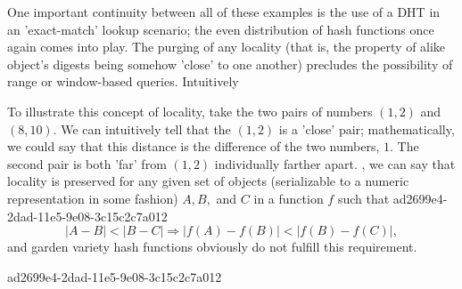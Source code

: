 \documentclass[12pt]{article}
\begin{document}
\par One important continuity between all of these examples is the use of a DHT in an 'exact-match' lookup scenario; the even distribution of hash functions once again comes into play. The purging of any locality (that is, the property of alike object's digests being somehow 'close' to one another) precludes the possibility of range or window-based queries. Intuitively

\par To illustrate this concept of locality, take the two pairs of numbers $(1,2)$ and $(8,10)$. We can intuitively tell that the $(1,2)$ is a 'close' pair; mathematically, we could say that this distance is the difference of the two numbers, $1$. The second pair is both 'far' from $(1,2)$ individually farther apart. , we can say that locality is preserved for any given set of objects (serializable to a numeric representation in some fashion) $A,B,$ and $C$ in a function $f$ such that
ad2699e4-2dad-11e5-9e08-3c15c2c7a012\begin{equation}
|A-B| < |B-C| \Rightarrow |f(A)-f(B)| < |f(B) - f(C)|,
\end{equation}
and garden variety hash functions obviously do not fulfill this requirement.

\printbibliography
ad2699e4-2dad-11e5-9e08-3c15c2c7a012
\end{document}
